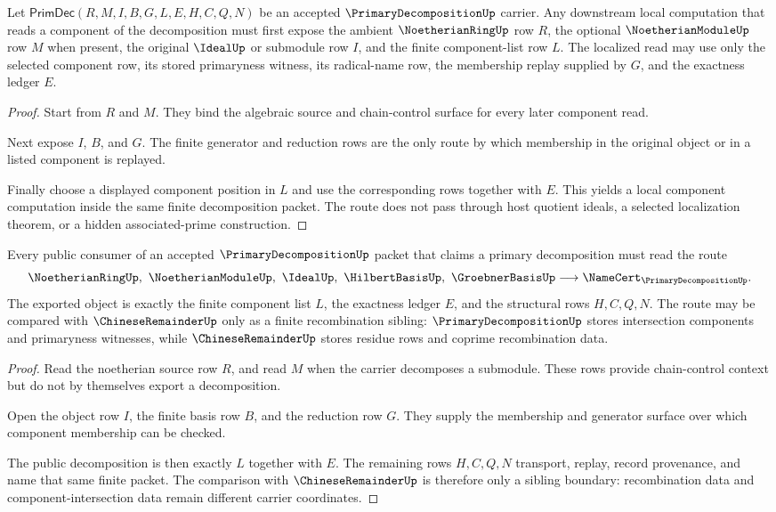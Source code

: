 \begin{theorem}\label{thm:primary-decomposition-localization}
Let $\mathsf{PrimDec}(R,M,I,B,G,L,E,H,C,Q,N)$ be an accepted $\PrimaryDecompositionUp$ carrier. Any downstream local computation that reads a component of the decomposition must first expose the ambient $\NoetherianRingUp$ row $R$, the optional $\NoetherianModuleUp$ row $M$ when present, the original $\IdealUp$ or submodule row $I$, and the finite component-list row $L$. The localized read may use only the selected component row, its stored primaryness witness, its radical-name row, the membership replay supplied by $G$, and the exactness ledger $E$.
\end{theorem}
\begin{proof}
Start from $R$ and $M$. They bind the algebraic source and chain-control surface for every later component read.

Next expose $I$, $B$, and $G$. The finite generator and reduction rows are the only route by which membership in the original object or in a listed component is replayed.

Finally choose a displayed component position in $L$ and use the corresponding rows together with $E$. This yields a local component computation inside the same finite decomposition packet. The route does not pass through host quotient ideals, a selected localization theorem, or a hidden associated-prime construction.
\end{proof}

\begin{theorem}\label{thm:primary-decomposition-namecert}
Every public consumer of an accepted $\PrimaryDecompositionUp$ packet that claims a primary decomposition must read the route
$$
\NoetherianRingUp,\ \NoetherianModuleUp,\ \IdealUp,\ \HilbertBasisUp,\ \GroebnerBasisUp
\longrightarrow
\NameCert_{\PrimaryDecompositionUp}.
$$
The exported object is exactly the finite component list $L$, the exactness ledger $E$, and the structural rows $H,C,Q,N$. The route may be compared with $\ChineseRemainderUp$ only as a finite recombination sibling: $\PrimaryDecompositionUp$ stores intersection components and primaryness witnesses, while $\ChineseRemainderUp$ stores residue rows and coprime recombination data.
\end{theorem}
\begin{proof}
Read the noetherian source row $R$, and read $M$ when the carrier decomposes a submodule. These rows provide chain-control context but do not by themselves export a decomposition.

Open the object row $I$, the finite basis row $B$, and the reduction row $G$. They supply the membership and generator surface over which component membership can be checked.

The public decomposition is then exactly $L$ together with $E$. The remaining rows $H,C,Q,N$ transport, replay, record provenance, and name that same finite packet. The comparison with $\ChineseRemainderUp$ is therefore only a sibling boundary: recombination data and component-intersection data remain different carrier coordinates.
\end{proof}

